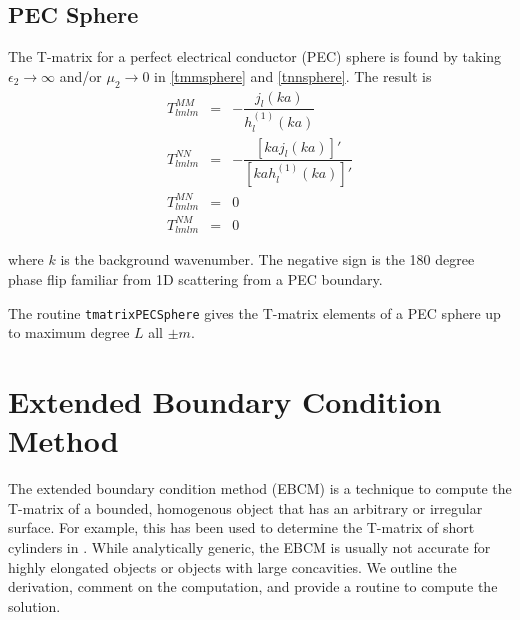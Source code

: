 {\footnotesize
{}
}



\subsection{PEC Sphere}

The T-matrix for a perfect electrical conductor (PEC) sphere is found by taking $\epsilon_2 \rightarrow \infty$ and/or $\mu_2 \rightarrow 0$ in \eqref{tmmsphere} and \eqref{tnnsphere}.  The result is
\begin{eqnarray}
T_{lmlm}^{MM} &=& -\dfrac{j_l(ka)}{h_l^{(1)}(ka)} \\
T_{lmlm}^{NN} &=& -\dfrac{[k a j_l(ka)]'}{[k a h_l^{(1)}(ka)]'} \\
T_{lmlm}^{MN} &=& 0 \\
T_{lmlm}^{NM} &=& 0 
\end{eqnarray}

\noindent where $k$ is the background wavenumber.  The negative sign is the 180 degree phase flip familiar from 1D scattering from a PEC boundary. 

The routine \texttt{tmatrixPECSphere} gives the T-matrix elements of a PEC sphere up to maximum degree $L$ all $\pm m$.  

{\footnotesize
{}
}


\clearpage
\newpage
\section{Extended Boundary Condition Method}

The extended boundary condition method (EBCM) is a technique to compute the T-matrix of a bounded, homogenous object that has an arbitrary or irregular surface. For example, this has been used to determine the T-matrix of short cylinders in \cite{duan2015experimental}.  While analytically generic, the EBCM is usually not accurate for highly elongated objects or objects with large concavities. We outline the derivation, comment on the computation, and provide a routine to compute the solution.

